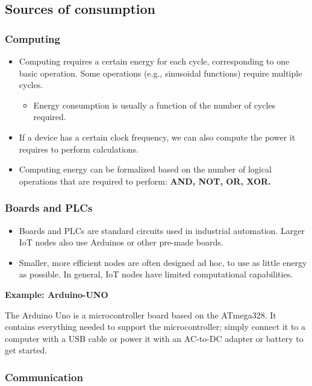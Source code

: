 \subsection{Sources of consumption}

\subsubsection{Computing}

\begin{itemize}
    \item Computing requires a certain energy for each cycle, corresponding to one basic operation. Some operations (e.g., sinusoidal functions) require multiple cycles.
    \begin{itemize}
        \item Energy consumption is usually a function of the number of cycles required.
    \end{itemize}
    \item If a device has a certain clock frequency, we can also compute the power it requires to perform calculations.
    \item Computing energy can be formalized based on the number of logical operations that are required to perform: \textbf{AND, NOT, OR, XOR.}
\end{itemize}

\subsubsection{Boards and PLCs}
\begin{itemize}
    \item Boards and PLCs are standard circuits used in industrial automation. Larger IoT nodes also use Arduinos or other pre-made boards.
    \item Smaller, more efficient nodes are often designed ad hoc, to use as little energy as possible. In general, IoT nodes have limited computational capabilities.
\end{itemize}

\textbf{Example: Arduino-UNO}

The Arduino Uno is a microcontroller board based on the ATmega328.
It contains everything needed to support the microcontroller; simply connect it to a computer with a USB cable or power it with an AC-to-DC adapter or battery to get started.

\subsubsection{Communication}

